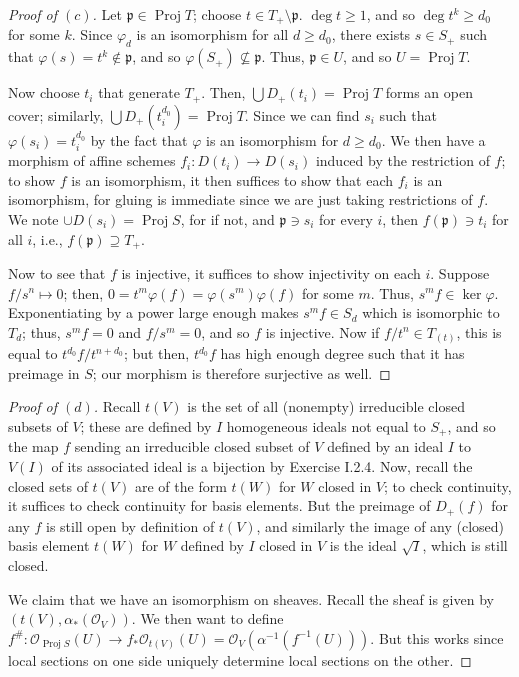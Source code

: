 \documentclass[10pt]{article}
\theoremstyle{definition}
\theoremstyle{remark}
\numberwithin{equation}{section}
\numberwithin{figure}{subsubsection}
\DeclareMathOperator{\Proj}{Proj}
\newcommand{\OO}{\mathcal{O}}
\begin{document}
\begin{proof}[Proof of $(c)$]
  Let $\mathfrak{p} \in \Proj T$; choose $t \in T_+ \setminus \mathfrak{p}$. $\deg t \ge 1$, and so $\deg t^k \ge d_0$ for some $k$. Since $\varphi_d$ is an isomorphism for all $d \ge d_0$, there exists $s \in S_+$ such that $\varphi(s) = t^k \notin \mathfrak{p}$, and so $\varphi(S_+) \not\subseteq \mathfrak{p}$. Thus, $\mathfrak{p} \in U$, and so $U = \Proj T$.
  \par Now choose $t_i$ that generate $T_+$. Then, $\bigcup D_+(t_i) = \Proj T$ forms an open cover; similarly, $\bigcup D_+(t_i^{d_0}) = \Proj T$. Since we can find $s_i$ such that $\varphi(s_i) = t_i^{d_0}$ by the fact that $\varphi$ is an isomorphism for $d \ge d_0$. We then have a morphism of affine schemes $f_i\colon D(t_i) \to D(s_i)$ induced by the restriction of $f$; to show $f$ is an isomorphism, it then suffices to show that each $f_i$ is an isomorphism, for gluing is immediate since we are just taking restrictions of $f$. We note $\cup D(s_i) = \Proj S$, for if not, and $\mathfrak{p} \ni s_i$ for every $i$, then $f(\mathfrak{p}) \ni t_i$ for all $i$, i.e., $f(\mathfrak{p}) \supseteq T_+$.
  \par Now to see that $f$ is injective, it suffices to show injectivity on each $i$. Suppose $f/s^n \mapsto 0$; then, $0 = t^m\varphi(f) = \varphi(s^m)\varphi(f)$ for some $m$. Thus, $s^mf \in \ker\varphi$. Exponentiating by a power large enough makes $s^mf \in S_d$ which is isomorphic to $T_d$; thus, $s^mf = 0$ and $f/s^m = 0$, and so $f$ is injective. Now if $f/t^n \in T_{(t)}$, this is equal to $t^{d_0}f/t^{n+d_0}$; but then, $t^{d_0}f$ has high enough degree such that it has preimage in $S$; our morphism is therefore surjective as well.
\end{proof}
\begin{proof}[Proof of $(d)$]
  Recall $t(V)$ is the set of all (nonempty) irreducible closed subsets of $V$; these are defined by $I$ homogeneous ideals not equal to $S_+$, and so the map $f$ sending an irreducible closed subset of $V$ defined by an ideal $I$ to $V(I)$ of its associated ideal is a bijection by Exercise I.2.4. Now, recall the closed sets of $t(V)$ are of the form $t(W)$ for $W$ closed in $V$; to check continuity, it suffices to check continuity for basis elements. But the preimage of $D_+(f)$ for any $f$ is still open by definition of $t(V)$, and similarly the image of any (closed) basis element $t(W)$ for $W$ defined by $I$ closed in $V$ is the ideal $\sqrt{I}$, which is still closed.
  \par We claim that we have an isomorphism on sheaves. Recall the sheaf is given by $(t(V),\alpha_*(\OO_V))$. We then want to define $f^\#\colon \OO_{\Proj S}(U) \to f_*\OO_{t(V)}(U) = \OO_{V}(\alpha^{-1}(f^{-1}(U)))$. But this works since local sections on one side uniquely determine local sections on the other.
\end{proof}
\end{document}
